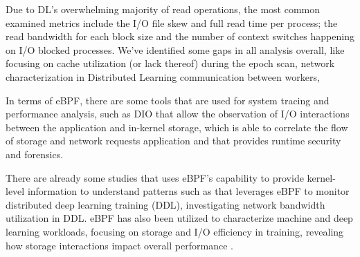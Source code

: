 \documentclass[conference]{IEEEtran}
\begin{document}
Due to DL's overwhelming majority of read operations, the most common examined metrics include the I/O file skew and full read time per process; the read bandwidth for each block size and the number of context switches happening on I/O blocked processes. We've identified some gaps in all analysis overall, like focusing on cache utilization (or lack thereof) during the epoch scan, network characterization in Distributed Learning communication between workers,  

In terms of eBPF, there are some tools that are used for system tracing and performance analysis,
such as DIO \cite{DIO} that allow the observation of I/O interactions between the application and in-kernel storage,
\cite{CAT} which is able to correlate the flow of storage and network requests application and \cite{tracee} that provides runtime security and forensics.  

There are already some studies that uses eBPF's capability to provide kernel-level information to understand patterns such as \cite{eBPFDLNetwork} that
leverages eBPF to monitor distributed deep learning training (DDL), investigating network bandwidth utilization in DDL.
eBPF has also been utilized to characterize machine and deep learning workloads, focusing on storage and I/O efficiency in training,
revealing how storage interactions impact overall performance \cite{OanaDL, OanaML}.
\end{document}
